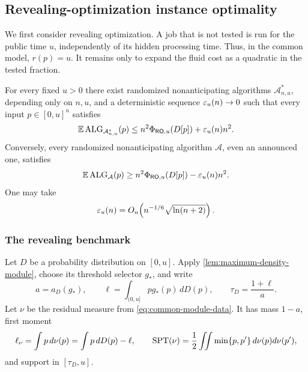 \subsection{Revealing-optimization instance optimality}
\label{sec:common-upper-instance}

We first consider revealing optimization.  A job that is not tested is run
for the public time $u$, independently of its hidden processing time.  Thus,
in the common model, $r(p)=u$.  It remains only to expand the fluid cost as a
quadratic in the tested fraction.

\begin{theorem}
\label{thm:common-upper-instance}
For every fixed $u>0$ there exist randomized nonanticipating algorithms
$\mathcal A^*_{n,u}$, depending only on $n,u$, and a deterministic sequence
$\varepsilon_u(n)\to0$ such that every input $p\in[0,u]^n$ satisfies
\begin{equation}
 \mathbb{E}\operatorname{ALG}_{\mathcal A^*_{n,u}}(p)
 \le n^2\Phi_{\mathsf{RO},u}(D[p])+\varepsilon_u(n)n^2.
 \label{eq:cui-upper}
\end{equation}
Conversely, every randomized nonanticipating algorithm $\mathcal A$, even an
announced one, satisfies
\begin{equation}
 \mathbb{E}\operatorname{ALG}_{\mathcal A}(p)
 \ge n^2\Phi_{\mathsf{RO},u}(D[p])-\varepsilon_u(n)n^2.
 \label{eq:cui-lower}
\end{equation}
One may take
\begin{equation}
 \varepsilon_u(n)=O_u\!\left(n^{-1/6}\sqrt{\ln(n+2)}\right).
 \label{eq:cui-rate}
\end{equation}
\end{theorem}

\subsubsection{The revealing benchmark}
\label{sec:cui-fluid}

Let $D$ be a probability distribution on $[0,u]$.  Apply
\cref{lem:maximum-density-module}, choose its threshold selector $g_*$, and
write
\begin{equation}
 a=a_D(g_*),\qquad
 \ell=\int_{(0,u]}p g_*(p)\,dD(p),
 \qquad \tau_D=\frac{1+\ell}{a}.
 \label{eq:cui-tau}
\end{equation}
Let $\nu$ be the residual measure from
\cref{eq:common-module-data}.  It has mass $1-a$, first moment
\begin{equation}
 \ell_\nu=\int p\,d\nu(p)=\int p\,dD(p)-\ell,
 \qquad
 \operatorname{SPT}(\nu)=\frac12\iint\min\{p,p'\}\,d\nu(p)d\nu(p'),
 \label{eq:cui-residual-moments}
\end{equation}
and support in $[\tau_D,u]$.

